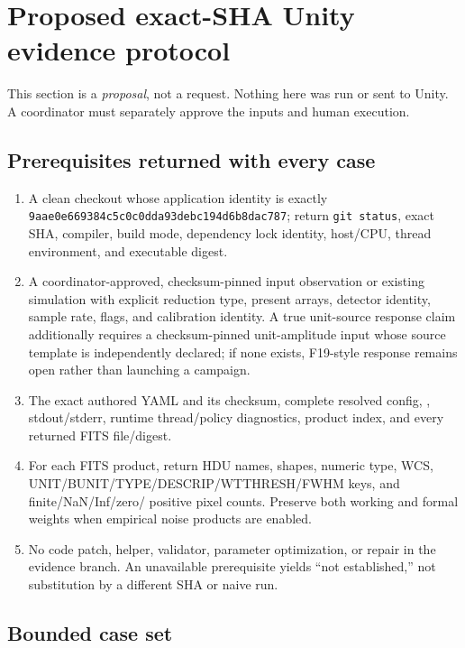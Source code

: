 \documentclass[10pt]{article}
\newcommand{\appsha}{9aae0e669384c5c0c0dda93debc194d6b8dac787}
\begin{document}
\section{Proposed exact-SHA Unity evidence protocol}
\label{sec:protocol}

This section is a \emph{proposal}, not a request.  Nothing here was run or
sent to Unity.  A coordinator must separately approve the inputs and human
execution.

\subsection{Prerequisites returned with every case}

\begin{enumerate}[leftmargin=*]
  \item A clean checkout whose application identity is exactly
        \texttt{\appsha}; return \texttt{git status}, exact SHA, compiler,
        build mode, dependency lock identity, host/CPU, thread environment,
        and executable digest.
  \item A coordinator-approved, checksum-pinned input observation or existing
        simulation with explicit reduction type, present arrays, detector
        identity, sample rate, flags, and calibration identity.  A true
        unit-source response claim additionally requires a checksum-pinned
        unit-amplitude input whose source template is independently declared;
        if none exists, F19-style response remains open rather than launching
        a campaign.
  \item The exact authored YAML and its checksum, complete resolved config,
        , stdout/stderr, runtime thread/policy
        diagnostics, product index, and every returned FITS file/digest.
  \item For each FITS product, return HDU names, shapes, numeric type, WCS,
        UNIT/BUNIT/TYPE/DESCRIP/WTTHRESH/FWHM keys, and finite/NaN/Inf/zero/
        positive pixel counts.  Preserve both working and formal weights when
        empirical noise products are enabled.
  \item No code patch, helper, validator, parameter optimization, or repair in
        the evidence branch.  An unavailable prerequisite yields ``not
        established,'' not substitution by a different SHA or naive run.
\end{enumerate}

\subsection{Bounded case set}
\end{document}
